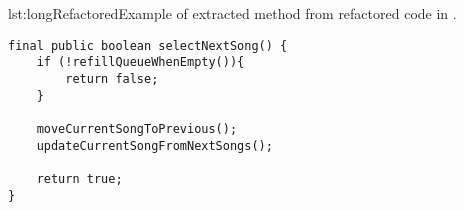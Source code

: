 \begin{code}{lst:longRefactored}{Example of extracted method from refactored code in .}
\begin{lstlisting}
final public boolean selectNextSong() {
    if (!refillQueueWhenEmpty()){
        return false;
    }

    moveCurrentSongToPrevious();
    updateCurrentSongFromNextSongs();

    return true;
}
\end{lstlisting}
\end{code}
